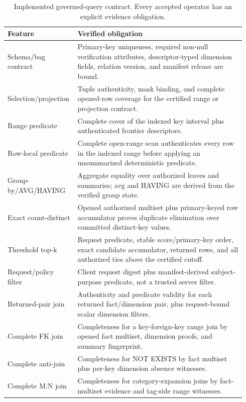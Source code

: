 \documentclass[conference]{IEEEtran}
\begin{document}
\begin{table}[t]
\centering
\caption{Implemented governed-query contract. Every accepted operator has an explicit evidence obligation.}
\label{tab:scope}
\scriptsize
{\setlength{\tabcolsep}{2pt}
\begin{tabular}{@{}p{0.25\linewidth}p{0.69\linewidth}@{}}
\toprule
Feature & Verified obligation \\
\midrule
Schema/bag contract & Primary-key uniqueness, required non-null verification attributes, descriptor-typed dimension fields, relation version, and manifest release are bound. \\
Selection/\newline projection & Tuple authenticity, mask binding, and complete opened-row coverage for the certified range or projection contract. \\
Range predicate & Complete cover of the indexed key interval plus authenticated frontier descriptors. \\
Row-local predicate & Complete open-range scan authenticates every row in the indexed range before applying an unsummarized deterministic predicate. \\
Group-by/AVG/\newline HAVING & Aggregate equality over authorized leaves and summaries; avg and HAVING are derived from the verified group state. \\
Exact count-distinct & Opened authorized multiset plus primary-keyed row accumulator proves duplicate elimination over committed distinct-key values. \\
Threshold top-k & Request predicate, stable score/primary-key order, exact candidate accumulator, returned rows, and all authorized ties above the certified cutoff. \\
Request/policy filter & Client request digest plus manifest-derived subject-purpose predicate, not a trusted server filter. \\
Returned-pair join & Authenticity and predicate validity for each returned fact/dimension pair, plus request-bound scalar dimension filters. \\
Complete FK join & Completeness for a key-foreign-key range join by opened fact multiset, dimension proofs, and summary fingerprint. \\
Complete anti-join & Completeness for NOT EXISTS by fact multiset plus per-key dimension absence witnesses. \\
Complete M:N join & Completeness for category-expansion joins by fact-multiset evidence and tag-side range witnesses. \\

\end{tabular}}
\end{table}
\end{document}
